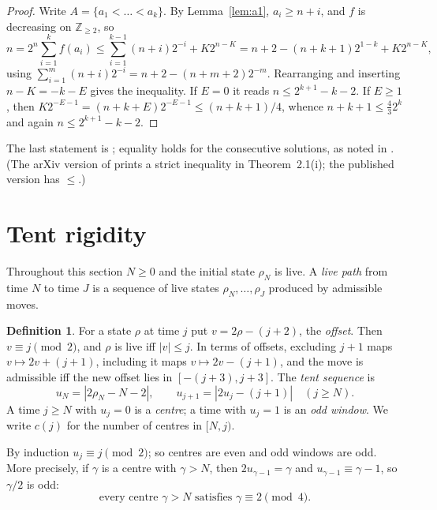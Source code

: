 \documentclass[11pt]{amsart}
\theoremstyle{definition}
\newtheorem{definition}[theorem]{Definition}
\theoremstyle{remark}
\newcommand{\Z}{\mathbb{Z}}
\begin{document}
\begin{proof}
Write $A=\{a_1<\dots<a_k\}$. By Lemma~\ref{lem:a1}, $a_i\ge n+i$, and $f$ is decreasing on $\Z_{\ge2}$, so
\[
n=2^n\sum_{i=1}^{k}f(a_i)\le\sum_{i=1}^{k-1}(n+i)2^{-i}+K2^{n-K}=n+2-(n+k+1)2^{1-k}+K2^{n-K},
\]
using $\sum_{i=1}^m(n+i)2^{-i}=n+2-(n+m+2)2^{-m}$. Rearranging and inserting $n-K=-k-E$ gives the inequality. If $E=0$ it reads $n\le 2^{k+1}-k-2$. If $E\ge1$, then $K2^{-E-1}=(n+k+E)2^{-E-1}\le(n+k+1)/4$, whence $n+k+1\le\frac43 2^k$ and again $n\le2^{k+1}-k-2$.
\end{proof}

The last statement is \cite[Thm.~2.1(i)]{TUZ}; equality holds for the consecutive solutions, as noted in \cite[Rem.~2.2]{TUZ}. (The arXiv version of \cite{TUZ} prints a strict inequality in Theorem~2.1(i); the published version has $\le$.)

\section{Tent rigidity}\label{sec:tent}

Throughout this section $N\ge0$ and the initial state $\rho_N$ is live. A \emph{live path} from time $N$ to time $J$ is a sequence of live states $\rho_N,\dots,\rho_J$ produced by admissible moves.

\begin{definition}
For a state $\rho$ at time $j$ put $v=2\rho-(j+2)$, the \emph{offset}. Then $v\equiv j\pmod2$, and $\rho$ is live iff $|v|\le j$. In terms of offsets, excluding $j+1$ maps $v\mapsto 2v+(j+1)$, including it maps $v\mapsto 2v-(j+1)$, and the move is admissible iff the new offset lies in $[-(j+3),j+3]$. The \emph{tent sequence} is
\[
u_N=|2\rho_N-N-2|,\qquad u_{j+1}=|2u_j-(j+1)|\quad(j\ge N).
\]
A time $j\ge N$ with $u_j=0$ is a \emph{centre}; a time with $u_j=1$ is an \emph{odd window}. We write $c(j)$ for the number of centres in $[N,j)$.
\end{definition}

By induction $u_j\equiv j\pmod 2$; so centres are even and odd windows are odd. More precisely, if $\gamma$ is a centre with $\gamma>N$, then $2u_{\gamma-1}=\gamma$ and $u_{\gamma-1}\equiv\gamma-1$, so $\gamma/2$ is odd:
\begin{equation}\label{eq:mod4}
\text{every centre }\gamma>N\text{ satisfies }\gamma\equiv2\pmod4 .
\end{equation}
\end{document}
